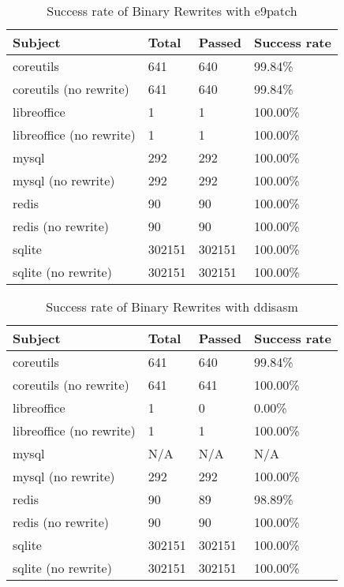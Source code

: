 \documentclass[a4paper,11pt,oneside]{report}
\begin{document}
    \begin{table}[h]
    \centering
    \caption{Success rate of Binary Rewrites with e9patch}
    \begin{tabular}{|l|l|l|l|}
    \hline
    Subject & Total & Passed & Success rate \\ \hline
    coreutils & 641 & 640 & 99.84\% \\ \hline
    coreutils (no rewrite) & 641 & 640 & 99.84\% \\ \hline
    libreoffice & 1 & 1 & 100.00\% \\ \hline
    libreoffice (no rewrite) & 1 & 1 & 100.00\% \\ \hline
    mysql & 292 & 292 & 100.00\% \\ \hline
    mysql (no rewrite) & 292 & 292 & 100.00\% \\ \hline
    redis & 90 & 90 & 100.00\% \\ \hline
    redis (no rewrite) & 90 & 90 & 100.00\% \\ \hline
    sqlite & 302151 & 302151 & 100.00\% \\ \hline
    sqlite (no rewrite) & 302151 & 302151 & 100.00\% \\ \hline
    \end{tabular}
    \end{table}
    
    \begin{table}[h]
    \centering
    \caption{Success rate of Binary Rewrites with ddisasm}
    \begin{tabular}{|l|l|l|l|}
    \hline
    Subject & Total & Passed & Success rate \\ \hline
    coreutils & 641 & 640 & 99.84\% \\ \hline
    coreutils (no rewrite) & 641 & 641 & 100.00\% \\ \hline
    libreoffice & 1 & 0 & 0.00\% \\ \hline
    libreoffice (no rewrite) & 1 & 1 & 100.00\% \\ \hline
    mysql & N/A & N/A & N/A \\ \hline
    mysql (no rewrite) & 292 & 292 & 100.00\% \\ \hline
    redis & 90 & 89 & 98.89\% \\ \hline
    redis (no rewrite) & 90 & 90 & 100.00\% \\ \hline
    sqlite & 302151 & 302151 & 100.00\% \\ \hline
    sqlite (no rewrite) & 302151 & 302151 & 100.00\% \\ \hline
    \end{tabular}
    \end{table}
    
\end{document}
